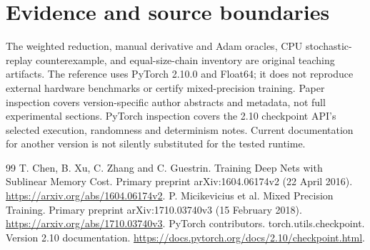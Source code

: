 \chapter*{Evidence and source boundaries}
The weighted reduction, manual derivative and Adam oracles, CPU stochastic-replay
counterexample, and equal-size-chain inventory are original teaching artifacts.
The reference uses PyTorch 2.10.0 and Float64; it does not reproduce external
hardware benchmarks or certify mixed-precision training. Paper inspection covers
version-specific author abstracts and metadata, not full experimental sections.
PyTorch inspection covers the 2.10 checkpoint API's selected execution, randomness
and determinism notes. Current documentation for another version is not silently
substituted for the tested runtime.
\begin{thebibliography}{99}
 T. Chen, B. Xu, C. Zhang and C. Guestrin.
Training Deep Nets with Sublinear Memory Cost.
Primary preprint arXiv:1604.06174v2 (22 April 2016).
\url{https://arxiv.org/abs/1604.06174v2}.
 P. Micikevicius et al.
Mixed Precision Training.
Primary preprint arXiv:1710.03740v3 (15 February 2018).
\url{https://arxiv.org/abs/1710.03740v3}.
 PyTorch contributors.
torch.utils.checkpoint. Version 2.10 documentation.
\url{https://docs.pytorch.org/docs/2.10/checkpoint.html}.
\end{thebibliography}
